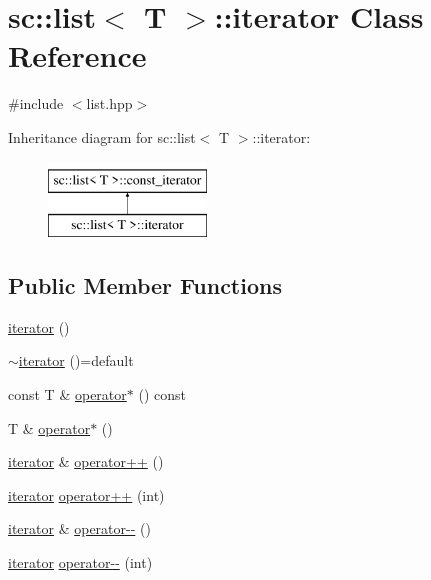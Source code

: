 \hypertarget{classsc_1_1list_1_1iterator}{}\section{sc\+:\+:list$<$ T $>$\+:\+:iterator Class Reference}
\label{classsc_1_1list_1_1iterator}


{\ttfamily \#include $<$list.\+hpp$>$}

Inheritance diagram for sc\+:\+:list$<$ T $>$\+:\+:iterator\+:\begin{figure}[H]
\begin{center}
\leavevmode
\includegraphics[height=2.000000cm]{classsc_1_1list_1_1iterator}
\end{center}
\end{figure}
\subsection*{Public Member Functions}
\begin{DoxyCompactItemize}
\item 
\mbox{\hyperlink{classsc_1_1list_1_1iterator_acd90feec03d8a2762f36407a27166bb9}{iterator}} ()
\item 
\mbox{\hyperlink{classsc_1_1list_1_1iterator_a84674835b45ab08a280df0c6a474b57a}{$\sim$iterator}} ()=default
\item 
const T \& \mbox{\hyperlink{classsc_1_1list_1_1iterator_a8e1feb979567a3fa27add54563d0008f}{operator$\ast$}} () const
\item 
T \& \mbox{\hyperlink{classsc_1_1list_1_1iterator_a302efc11d84340a0f69090c001c19b79}{operator$\ast$}} ()
\item 
\mbox{\hyperlink{classsc_1_1list_1_1iterator}{iterator}} \& \mbox{\hyperlink{classsc_1_1list_1_1iterator_a1853e5deff88ddd275f51b366971de17}{operator++}} ()
\item 
\mbox{\hyperlink{classsc_1_1list_1_1iterator}{iterator}} \mbox{\hyperlink{classsc_1_1list_1_1iterator_a07136b928446a99cfb298e631ab0e07e}{operator++}} (int)
\item 
\mbox{\hyperlink{classsc_1_1list_1_1iterator}{iterator}} \& \mbox{\hyperlink{classsc_1_1list_1_1iterator_a2780ff54bf392eb23811ca9b7d116908}{operator-\/-\/}} ()
\item 
\mbox{\hyperlink{classsc_1_1list_1_1iterator}{iterator}} \mbox{\hyperlink{classsc_1_1list_1_1iterator_ae0508132c274454f7199eb801a28f4e9}{operator-\/-\/}} (int)
\end{DoxyCompactItemize}
